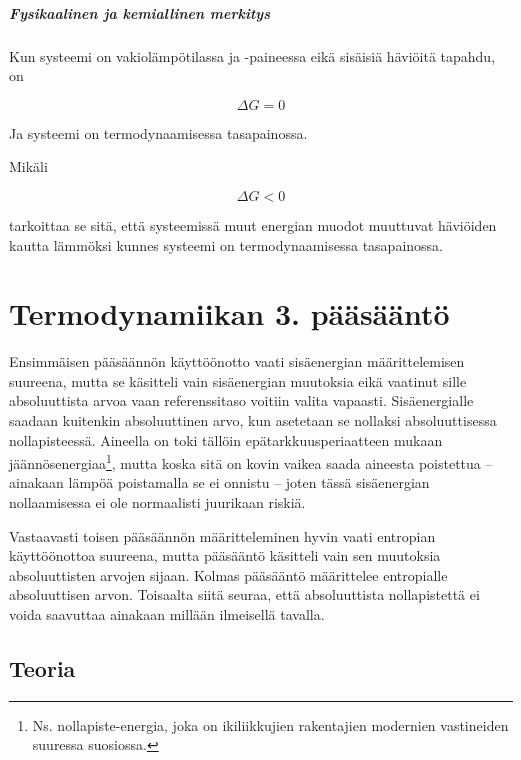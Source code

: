 \documentclass[12pt,a4paper,finnish]{book}
\begin{document}
\paragraph{Fysikaalinen ja kemiallinen merkitys}

Kun systeemi on vakiolämpötilassa ja -paineessa eikä sisäisiä häviöitä tapahdu, on 

\begin{equation}
 \Delta G = 0
\end{equation}

Ja systeemi on termodynaamisessa tasapainossa.

Mikäli

\begin{equation}
 \Delta G < 0
\end{equation}

tarkoittaa se sitä, että systeemissä muut energian muodot muuttuvat häviöiden kautta lämmöksi 
kunnes systeemi on termodynaamisessa tasapainossa.

\chapter{Termodynamiikan 3. pääsääntö} %

Ensimmäisen pääsäännön käyttöönotto vaati sisäenergian määrittelemisen suureena, mutta se käsitteli vain 
sisäenergian muutoksia eikä vaatinut sille absoluuttista arvoa vaan referenssitaso voitiin valita 
vapaasti. Sisäenergialle saadaan kuitenkin absoluuttinen arvo, kun asetetaan se nollaksi 
absoluuttisessa nollapisteessä. Aineella on toki tällöin epätarkkuusperiaatteen mukaan 
jäännösenergiaa\footnote{Ns. nollapiste-energia, joka on ikiliikkujien rakentajien modernien vastineiden 
suuressa suosiossa.}, mutta koska sitä on kovin vaikea saada aineesta poistettua -- ainakaan lämpöä 
poistamalla se ei onnistu -- joten tässä sisäenergian nollaamisessa ei ole normaalisti juurikaan riskiä.

Vastaavasti toisen pääsäännön määritteleminen hyvin vaati entropian käyttöönottoa suureena, mutta pääsääntö 
käsitteli vain sen muutoksia absoluuttisten arvojen sijaan. Kolmas pääsääntö määrittelee entropialle 
absoluuttisen arvon. Toisaalta siitä seuraa, että absoluuttista nollapistettä ei voida saavuttaa ainakaan 
millään ilmeisellä tavalla.

\section{Teoria} %
\end{document}
